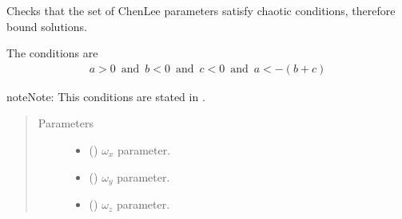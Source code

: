 \documentclass[a4paper,landscape,10pt,english]{sphinxmanual}
\begin{document}
\begin{fulllineitems}
\label{\detokenize{code_docs/simulation_api.controller:simulation_api.controller.tasks._check_chen_lee_params}}
Checks that the set of Chen\sphinxhyphen{}Lee parameters satisfy chaotic conditions,
therefore bound solutions.

The conditions are
\begin{equation*}
\begin{split}a > 0 \,\text{ and }\, b < 0 \,\text{ and }\, c < 0 \,\text{ and }\, a < - (b + c)\end{split}
\end{equation*}
\begin{sphinxadmonition}{note}{Note:}
This conditions are stated in .
\end{sphinxadmonition}
\begin{quote}\begin{description}
\item[{Parameters}] \leavevmode\begin{itemize}
\item {} 
 () \textendash{} \(\omega_x\) parameter.

\item {} 
 () \textendash{} \(\omega_y\) parameter.

\item {} 
 () \textendash{} \(\omega_z\) parameter.

\end{itemize}

\end{description}\end{quote}

\end{fulllineitems}

\end{document}
